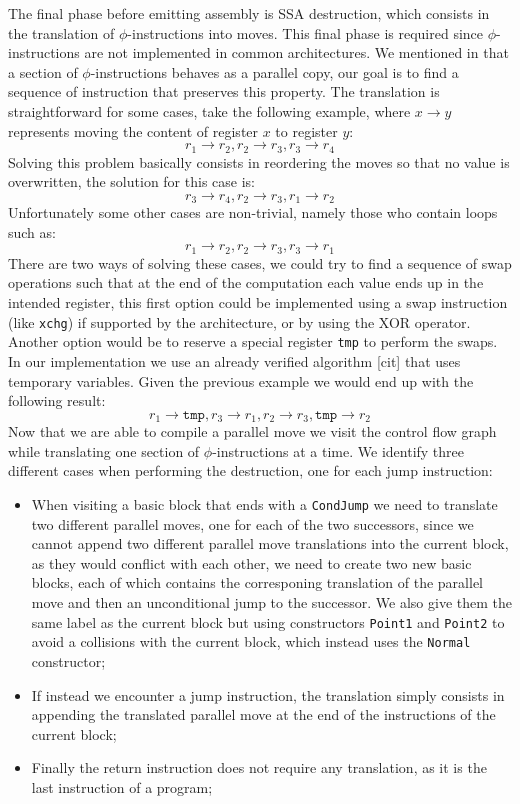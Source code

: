 The final phase before emitting assembly is SSA destruction, which consists in the translation of $\phi$-instructions into moves. This final phase is required since $\phi$-instructions are not implemented in common architectures.
We mentioned in  that a section of $\phi$-instructions behaves as a parallel copy, our goal is to find a sequence of instruction that preserves this property. The translation is straightforward for some cases, take the following example, where $x \to y$ represents moving the content of register $x$ to register $y$:
\[
  r_1 \to r_2, r_2 \to r_3, r_3 \to r_4
\]
Solving this problem basically consists in reordering the moves so that no value is overwritten, the solution for this case is:
\[
  r_3 \to r_4, r_2 \to r_3, r_1 \to r_2
\]
Unfortunately some other cases are non-trivial, namely those who contain loops such as:
\[
  r_1 \to r_2, r_2 \to r_3, r_3 \to r_1
\]
There are two ways of solving these cases, we could try to find a sequence of swap operations such that at the end of the computation each value ends up in the intended register, this first option could be implemented using a swap instruction (like \texttt{xchg}) if supported by the architecture, or by using the XOR operator. Another option would be to reserve a special register \texttt{tmp} to perform the swaps. In our implementation we use an already verified algorithm [cit] that uses temporary variables. Given the previous example we would end up with the following result:
\[
  r_1 \to \texttt{tmp}, r_3 \to r_1, r_2 \to r_3, \texttt{tmp} \to r_2
\]
Now that we are able to compile a parallel move we visit the control flow graph while translating one section of $\phi$-instructions at a time.
We identify three different cases when performing the destruction, one for each jump instruction:
\begin{itemize}
  \item When visiting a basic block that ends with a \texttt{CondJump} we need to translate two different parallel moves, one for each of the two successors, since we cannot append two different parallel move translations into the current block, as they would conflict with each other, we need to create two new basic blocks, each of which contains the corresponing translation of the parallel move and then an unconditional jump to the successor. We also give them the same label as the current block but using constructors \texttt{Point1} and \texttt{Point2} to avoid a collisions with the current block, which instead uses the \texttt{Normal} constructor;
  \item If instead we encounter a jump instruction, the translation simply consists in appending the translated parallel move at the end of the instructions of the current block;
  \item Finally the return instruction does not require any translation, as it is the last instruction of a program;
\end{itemize}

